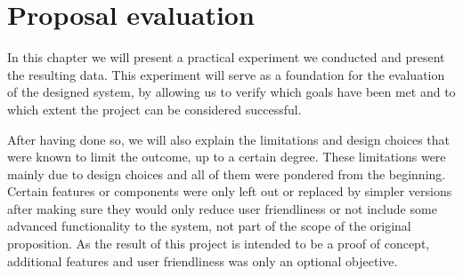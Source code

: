 \chapter{Proposal evaluation} \label{chap:eval}
In this chapter we will present a practical experiment we conducted and present the resulting data.
This experiment will serve as a foundation for the evaluation of the designed system, by allowing us to verify which goals have been met and to which extent the project can be considered successful.

After having done so, we will also explain the limitations and design choices that were known to limit the outcome, up to a certain degree.
These limitations were mainly due to design choices and all of them were pondered from the beginning.
Certain features or components were only left out or replaced by simpler versions after making sure they would only reduce user friendliness or not include some advanced functionality to the system, not part of the scope of the original proposition.
As the result of this project is intended to be a proof of concept, additional features and user friendliness was only an optional objective.




